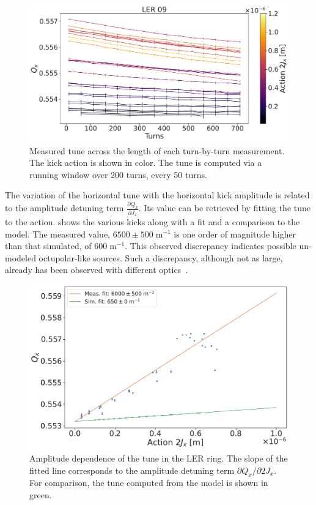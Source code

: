 \begin{figure}[!htb]
    \centering
    \includegraphics[width=0.8\linewidth]{images/kek/LER_detuned_ampdet.pdf}
    \caption{Measured tune across the length of each turn-by-turn measurement.
             The kick action is shown in color. The tune is computed
             via a running window over 200 turns, every 50 turns.}
    \label{fig:kek:ler_full_tune_ampdet}
\end{figure}

The variation of the horizontal tune with the horizontal kick amplitude is related to the amplitude
detuning term $\frac{\partial Q_x}{\partial J_x}$. Its value can be retrieved by fitting the tune to
the action.  shows the various kicks along with a fit and a comparison to
the model. The measured value, $6500 \pm 500\;\text{m}^{-1}$ is one order of magnitude higher than
that simulated, of $600\;\text{m}^{-1}$. This observed discrepancy indicates possible un-modeled
octupolar-like sources. Such a discrepancy, although not as large, already has been observed with
different optics~\cite{keintzel_jacqueline_beam_2022}.

\begin{figure}[!htb]
    \centering
    \includegraphics[width=0.7\linewidth]{images/kek/amplitude_detuning.pdf}
    \caption{Amplitude dependence of the tune in the LER ring. The slope of the fitted line corresponds to
    the amplitude detuning term $\partial Q_x/\partial 2J_x$. For comparison, the tune computed 
    from the model is shown in green.}
    \label{fig:kek:ler_ampdet}
\end{figure}



